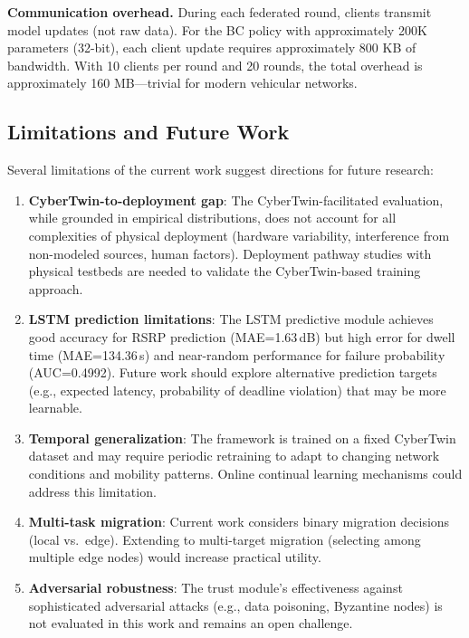 \documentclass[journal,twoside]{IEEEtran}
\begin{document}
\textbf{Communication overhead.} During each federated round, clients transmit model updates (not raw data). For the BC policy with approximately 200K parameters (32-bit), each client update requires approximately 800 KB of bandwidth. With 10 clients per round and 20 rounds, the total overhead is approximately 160 MB---trivial for modern vehicular networks.

\subsection{Limitations and Future Work}

Several limitations of the current work suggest directions for future research:

\begin{enumerate}
    \item \textbf{CyberTwin-to-deployment gap}: The CyberTwin-facilitated evaluation, while grounded in empirical distributions, does not account for all complexities of physical deployment (hardware variability, interference from non-modeled sources, human factors). Deployment pathway studies with physical testbeds are needed to validate the CyberTwin-based training approach.

    \item \textbf{LSTM prediction limitations}: The LSTM predictive module achieves good accuracy for RSRP prediction (MAE=1.63\,dB) but high error for dwell time (MAE=134.36\,s) and near-random performance for failure probability (AUC=0.4992). Future work should explore alternative prediction targets (e.g., expected latency, probability of deadline violation) that may be more learnable.

    \item \textbf{Temporal generalization}: The framework is trained on a fixed CyberTwin dataset and may require periodic retraining to adapt to changing network conditions and mobility patterns. Online continual learning mechanisms could address this limitation.

    \item \textbf{Multi-task migration}: Current work considers binary migration decisions (local vs.\ edge). Extending to multi-target migration (selecting among multiple edge nodes) would increase practical utility.

    \item \textbf{Adversarial robustness}: The trust module's effectiveness against sophisticated adversarial attacks (e.g., data poisoning, Byzantine nodes) is not evaluated in this work and remains an open challenge.


\end{enumerate}
\end{document}
